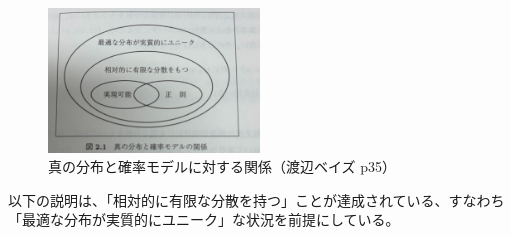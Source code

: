 \documentclass[dvipdfmx]{jsarticle}
\begin{document}
\begin{figure}[H]
    \centering
    \includegraphics[width=0.5\textwidth]{yuugennnabunsan.jpg}
    \caption{真の分布と確率モデルに対する関係（渡辺ベイズ p35）}
    \label{fig:katei}
\end{figure}
以下の説明は、「相対的に有限な分散を持つ」ことが達成されている、すなわち「最適な分布が実質的にユニーク」な状況を前提にしている。
\newpage
\end{document}
